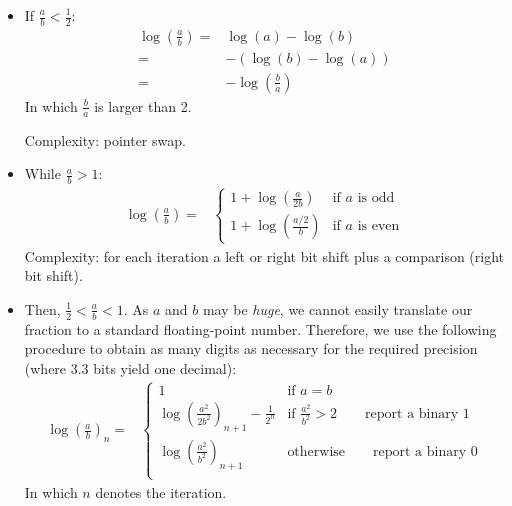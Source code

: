 \documentclass{book}
\begin{document}
                    \begin{itemize}
                        \item If $\frac{a}{b} < \frac{1}{2}$:
                        \begin{align*}
                            \log(\frac{a}{b}) ={}& \log(a) - \log(b)\\
                            {}={}& -(\log(b) - \log(a))\\
                            {}={}& -\log(\frac{b}{a})
                        \end{align*}
                        In which $\frac{b}{a}$ is larger than 2.
    
                        Complexity: pointer swap.
                        
                        \item While $\frac{a}{b} > 1$:
                        \begin{align*}
                            \log(\frac{a}{b}) ={}& \begin{cases}
                                1 + \log(\frac{a}{2b}) & \text{if } a \text{ is odd}\\
                                1 + \log(\frac{a/2}{b}) & \text{if } a \text{ is even} \end{cases}
                        \end{align*}
                        Complexity: for each iteration a left or right bit shift plus a comparison (right bit shift).
                        
                        \item Then, $\frac{1}{2} < \frac{a}{b} < 1$.
                        As $a$ and $b$ may be \emph{huge}, we cannot easily translate our fraction to a standard floating-point number.
                        Therefore, we use the following procedure to obtain as many digits as necessary for the required precision (where 3.3 bits yield one decimal):
                        \begin{align*}
                            \log(\frac{a}{b})_n ={}& \begin{cases}
                                1 & \text{if } a = b\\
                                \log(\frac{a^2}{2 b^2})_{n+1} - \frac{1}{2^n} & \text{if } \frac{a^2}{b^2} > 2 \qquad \text{report a binary } 1\\
                                \log(\frac{a^2}{b^2})_{n+1} & \text{otherwise} \qquad \text{report a binary } 0\\
                            \end{cases}
                        \end{align*}
                        In which $n$ denotes the iteration.
    

\end{itemize}
\end{document}
